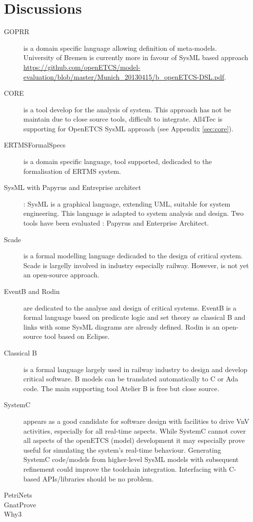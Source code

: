 \section{Discussions}


\tbd

\begin{description}
\item[GOPRR] is a domain specific language allowing definition of meta-models. University of Bremen is currently  more in favour of SysML based approach \url{https://github.com/openETCS/model-evaluation/blob/master/Munich_20130415/b_openETCS-DSL.pdf}.
\item[CORE] is a tool  develop for the analysis of system.  This approach has not be maintain due to close source tools, difficult to  integrate. All4Tec is supporting for OpenETCS SysML approach (see Appendix \ref{sec:core}).
\item[ERTMSFormalSpecs] is a domain specific language, tool supported, dedicaded to the formalisation of ERTMS system.
\item[SysML with Papyrus and Entreprise architect]: SysML is a graphical language, extending UML, suitable for system engineering. This language is adapted to  system  analysis and design. Two  tools have been evaluated : Papyrus and Enterprise Architect.
\item[Scade] is a formal modelling language dedicaded to the design of critical system. Scade is largelly  involved in industry  especially  railway. However, is not yet an open-source approach.
\item[EventB and Rodin] are dedicated to the analyse and design of critical  systems. EventB is a formal language based on predicate logic and set theory as classical B and links with some SysML  diagrams are already defined. Rodin is an open-source tool based on Eclipse.
\item[Classical B] is a formal  language largely used in railway industry  to  design and develop critical software. B models can be translated automatically to  C or Ada code. The main supporting tool Atelier B is free but close source.
\item[SystemC]  appears as a good candidate for software design with facilities to drive VnV activities, especially for all real-time aspects. While SystemC cannot cover all aspects of the openETCS (model) development it may especially prove useful for simulating the system's real-time behaviour. Generating SystemC code/models from higher-level SysML models with subsequent refinement could improve the toolchain integration. Interfacing with C-based APIs/libraries should be no problem. 
\item[PetriNets]
\item[GnatProve]
\item[Why3]
\end{description}